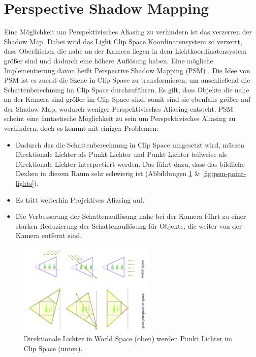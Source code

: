 \section{Perspective Shadow Mapping}
\label{section:psm}
Eine Möglichkeit um Perspektivisches Aliasing zu verhindern ist das verzerren 
der Shadow Map. 
Dabei wird das Light Clip Space Koordinatensystem so verzerrt, dass Oberflächen die nahe an der Kamera liegen in dem
Lichtkoordinatensystem größer sind und dadurch eine höhere Auflösung haben.
\newline
Eine mögliche Implementierung davon heißt Perspective Shadow Mapping (PSM) \cite{PSM2002}.
Die Idee von PSM ist es zuerst die Szene in Clip Space zu transformieren, um anschließend die Schattenberechnung 
im Clip Space durchzuführen.
Es gilt, dass Objekte die nahe an der Kamera sind größer im Clip Space sind, somit sind sie ebenfalls größer auf der Shadow Map, wodurch weniger Perspektivisches 
Aliasing entsteht.
PSM scheint eine fantastische Möglichkeit zu sein um Perspektivisches Aliasing zu verhindern,
doch es kommt mit einigen Problemen:
\begin{itemize}
  \item Dadurch das die Schattenberechnung in Clip Space umgesetzt wird,
    müssen Direktionale Lichter als Punkt Lichter und Punkt Lichter teilweise als Direktionale Lichter interpretiert werden.
    Das führt dazu, dass das bildliche Denken in diesem Raum sehr schwierig ist (Abbildungen \ref{fig:psm-dir-lights} \& \ref{fig:psm-point-lights}).
  \item Es tritt weiterhin Projektives Aliasing auf.
  \item Die Verbesserung der Schattenauflösung nahe bei der Kamera führt zu einer starken Reduzierung der Schattenauflösung
    für Objekte, die weiter von der Kamera entfernt sind.
\end{itemize}
\begin{figure}
	\begin{center}
    \includegraphics[width=0.6\textwidth]{res/img/psm_dir_lights.png}
    \caption{Direktionale Lichter in World Space (oben) werden Punkt Lichter im Clip Space (unten).}
	  \label{fig:psm-dir-lights}
	\end{center}
\end{figure}
